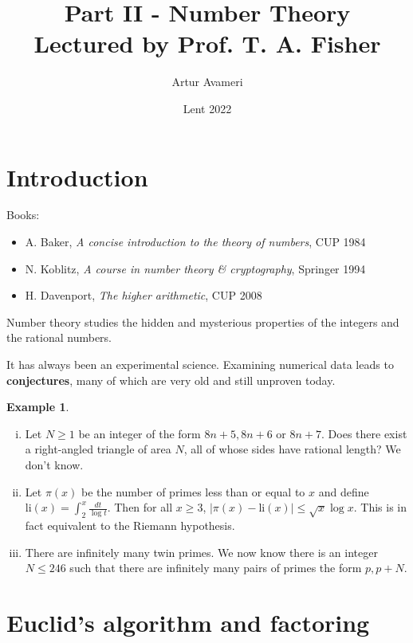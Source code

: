 \documentclass{article}
\title{Part II - Number Theory
    \\ \large
    Lectured by Prof. T. A. Fisher
}
\author{Artur Avameri}
\date{Lent 2022}
\theoremstyle{definition}
\newtheorem{example}{Example}[section]
\begin{document}
\maketitle
\tableofcontents
\newpage

\section{Introduction}


Books: 
\begin{itemize}
    \item A. Baker, \textit{A concise introduction to the theory of numbers}, CUP 1984
    \item N. Koblitz, \textit{A course in number theory \& cryptography}, Springer 1994
    \item H. Davenport, \textit{The higher arithmetic}, CUP 2008
\end{itemize}

Number theory studies the hidden and mysterious properties of the integers and the rational numbers.

It has always been an experimental science. Examining numerical data leads to \textbf{conjectures}, many of which are very old and still unproven today.

\begin{example}
    \begin{enumerate}[(i)]
        \item Let $N\ge 1$ be an integer of the form $8n+5, 8n+6$ or $8n+7$. Does there exist a right-angled triangle of area $N$, all of whose sides have rational length? We don't know.
        \item Let $\pi(x)$ be the number of primes less than or equal to $x$ and define $\text{li}(x) = \int_{2}^{x} \frac{dt}{\log t}$. Then for all $x \ge 3$, $|\pi(x) - \text{li}(x)| \le \sqrt{x}\log x$. This is in fact equivalent to the Riemann hypothesis.
        \item There are infinitely many twin primes. We now know there is an integer $N\le 246$ such that there are infinitely many pairs of primes the form $p, p+N$.
    \end{enumerate}
\end{example}

\newpage

\section{Euclid's algorithm and factoring}
\end{document}
